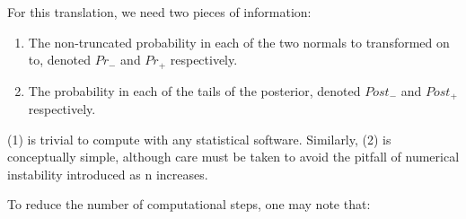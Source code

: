 
For this translation, we need two pieces of information:

\begin{enumerate}
\item The non-truncated probability in each of the two normals to transformed on to, denoted $Pr_{-}$ and $Pr_{+}$ respectively.
\item The probability in each of the tails of the posterior, denoted $Post_{-}$ and $Post_{+}$ respectively.
\end{enumerate}

(1) is trivial to compute with any statistical software. Similarly, (2) is conceptually simple, although care must be taken to avoid the pitfall of numerical instability introduced as n increases.

To reduce the number of computational steps, one may note that:


